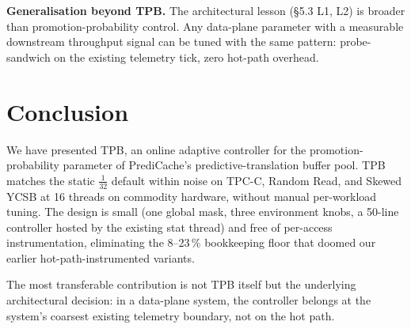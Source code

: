 \documentclass[10pt,twocolumn]{article}
\begin{document}
\textbf{Generalisation beyond TPB.}  The architectural lesson
(\S5.3 L1, L2) is broader than promotion-probability control.  Any
data-plane parameter with a measurable downstream throughput signal
can be tuned with the same pattern: probe-sandwich on the existing
telemetry tick, zero hot-path overhead.

\section{Conclusion}

We have presented TPB, an online adaptive controller for the
promotion-probability parameter of PrediCache's predictive-translation
buffer pool.  TPB matches the static $\tfrac{1}{32}$ default within
noise on TPC-C, Random Read, and Skewed YCSB at 16 threads on
commodity hardware, without manual per-workload tuning.  The design
is small (one global mask, three environment knobs, a 50-line
controller hosted by the existing stat thread) and free of
per-access instrumentation, eliminating the 8--23\,\% bookkeeping
floor that doomed our earlier hot-path-instrumented variants.

The most transferable contribution is not TPB itself but the
underlying architectural decision: in a data-plane system, the
controller belongs at the system's coarsest existing telemetry
boundary, not on the hot path.
\end{document}
